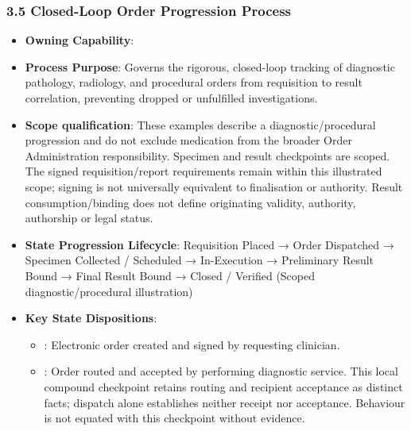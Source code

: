 \par\smallskip
{}\label{rad:processes:135}
\subsubsection*{3.5 Closed-Loop Order Progression Process}
\label{rad:processes:136}

\begin{itemize}

\item 
\textbf{Owning Capability}: \texttt{}



\item 
\textbf{Process Purpose}: Governs the rigorous, closed-loop tracking of diagnostic pathology, radiology, and procedural orders from requisition to result correlation, preventing dropped or unfulfilled investigations.



\item 
\textbf{Scope qualification}: These examples describe a diagnostic/\allowbreak{}procedural progression and do not exclude medication from the broader Order Administration responsibility. Specimen and result checkpoints are scoped. The signed requisition/\allowbreak{}report requirements remain within this illustrated scope; signing is not universally equivalent to finalisation or authority. Result consumption/\allowbreak{}binding does not define originating validity, authority, authorship or legal status.



\item 
\textbf{State Progression Lifecycle}: Requisition Placed → Order Dispatched → Specimen Collected /\allowbreak{} Scheduled → In-Execution → Preliminary Result Bound → Final Result Bound → Closed /\allowbreak{} Verified   (Scoped diagnostic/\allowbreak{}procedural illustration)



\item 
\textbf{Key State Dispositions}:


\begin{itemize}

\item 
\texttt{}: Electronic order created and signed by requesting clinician.



\item 
\texttt{}: Order routed and accepted by performing diagnostic service. This local compound checkpoint retains routing and recipient acceptance as distinct facts; dispatch alone establishes neither receipt nor acceptance. Behaviour \texttt{} is not equated with this checkpoint without evidence.




\end{itemize}
\end{itemize}

